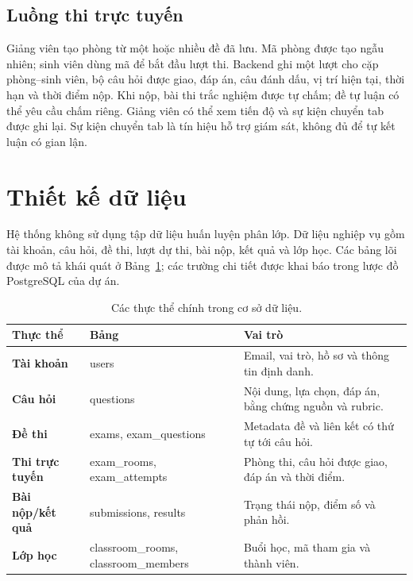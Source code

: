 \subsection{Luồng thi trực tuyến}
Giảng viên tạo phòng từ một hoặc nhiều đề đã lưu. Mã phòng được tạo ngẫu
nhiên; sinh viên dùng mã để bắt đầu lượt thi. Backend ghi một lượt cho
cặp phòng--sinh viên, bộ câu hỏi được giao, đáp án, câu đánh dấu, vị trí
hiện tại, thời hạn và thời điểm nộp. Khi nộp, bài thi trắc nghiệm được
tự chấm; đề tự luận có thể yêu cầu chấm riêng. Giảng viên có thể xem tiến
độ và sự kiện chuyển tab được ghi lại. Sự kiện chuyển tab là tín hiệu hỗ
trợ giám sát, không đủ để tự kết luận có gian lận.

\section{Thiết kế dữ liệu}

Hệ thống không sử dụng tập dữ liệu huấn luyện phân lớp. Dữ liệu nghiệp vụ
gồm tài khoản, câu hỏi, đề thi, lượt dự thi, bài nộp, kết quả và lớp học.
Các bảng lõi được mô tả khái quát ở Bảng~\ref{tab:dulieu}; các trường chi
tiết được khai báo trong lược đồ PostgreSQL của dự án.

\begin{table}[H]
\centering
\caption{Các thực thể chính trong cơ sở dữ liệu.}
\label{tab:dulieu}
\begin{tabular*}{\textwidth}{@{\extracolsep{\fill}}>{\bfseries\color{daunavy}}p{}>{\color{daumaroon}}p{}p{}}
\toprule
\rowcolor{gray100}\bfseries\color{daunavy}Thực thể & \bfseries\color{daumaroon}Bảng & \bfseries\color{daunavy}Vai trò \\
\midrule
Tài khoản & users & Email, vai trò, hồ sơ và thông tin định danh. \\
Câu hỏi & questions & Nội dung, lựa chọn, đáp án, bằng chứng nguồn và rubric. \\
Đề thi & exams, exam\_questions & Metadata đề và liên kết có thứ tự tới câu hỏi. \\
Thi trực tuyến & exam\_rooms, exam\_attempts & Phòng thi, câu hỏi được giao, đáp án và thời điểm. \\
Bài nộp/kết quả & submissions, results & Trạng thái nộp, điểm số và phản hồi. \\
Lớp học & classroom\_rooms, classroom\_members & Buổi học, mã tham gia và thành viên. \\
\bottomrule
\end{tabular*}
\end{table}


